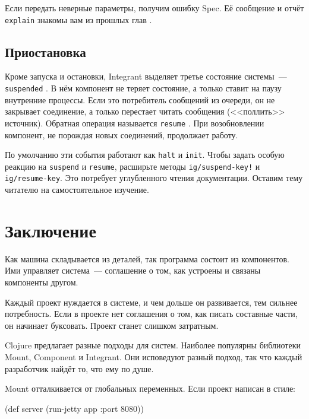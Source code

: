 \noindent
Если передать неверные параметры, получим ошибку Spec. Её сообщение и
отчёт \verb|explain| знакомы вам из прошлых глав .

\subsection{Приостановка}


Кроме запуска и остановки, Integrant выделяет третье состояние системы~---
\verb|suspended| . В нём компонент не теряет
состояние, а только ставит на паузу внутренние процессы. Если это потребитель
сообщений из очереди, он не закрывает соединение, а только перестает читать
сообщения (<<поллить>> источник). Обратная операция называется \verb|resume|
. При возобновлении компонент, не порождая новых соединений,
продолжает работу.

По умолчанию эти события работают как \verb|halt| и \verb|init|. Чтобы
задать особую реакцию на \verb|suspend| и \verb|resume|, расширьте методы
\verb|ig/suspend-key!| и \verb|ig/resume-key|. Это потребует углубленного
чтения документации. Оставим тему читателю на самостоятельное изучение.

\section{Заключение}

Как машина складывается из деталей, так программа состоит из компонентов. Ими
управляет система~--- соглашение о том, как устроены и связаны компоненты
другом.

Каждый проект нуждается в системе, и чем дольше он развивается, тем сильнее
потребность. Если в проекте нет соглашения о том, как писать составные части, он
начинает буксовать. Проект станет слишком затратным.

Clojure предлагает разные подходы для систем. Наиболее популярны библиотеки
Mount, Component и Integrant. Они исповедуют разный подход, так что каждый
разработчик найдёт то, что ему по душе.

Mount отталкивается от глобальных переменных. Если проект написан в стиле:

\begin{english}
  \begin{clojure}
(def server (run-jetty app {:port 8080}))
  \end{clojure}
\end{english}

